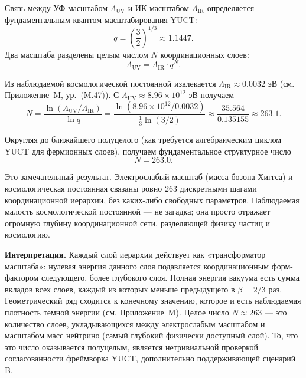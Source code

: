 \documentclass[11pt,a4paper]{article}
\newcommand{\LUV}{\Lambda_{\mathrm{UV}}}
\theoremstyle{remark}
\begin{document}
	Связь между УФ-масштабом \(\LUV\) и ИК-масштабом \(\Lambda_{\mathrm{IR}}\) определяется фундаментальным квантом масштабирования YUCT:
	\begin{equation}
		q = \left(\frac{3}{2}\right)^{1/3} \approx 1.1447.
	\end{equation}
	Два масштаба разделены целым числом \(N\) координационных слоев:
	\begin{equation}
		\LUV = \Lambda_{\mathrm{IR}} \cdot q^{N}.
		\label{eq:bridge}
	\end{equation}
	
	Из наблюдаемой космологической постоянной извлекается \(\Lambda_{\mathrm{IR}} \approx 0.0032\) эВ (см. Приложение~M, ур.~(M.47)). С \(\LUV \approx 8.96 \times 10^{12}\) эВ получаем
	\begin{equation}
		N = \frac{\ln(\LUV / \Lambda_{\mathrm{IR}})}{\ln q}
		= \frac{\ln(8.96 \times 10^{12} / 0.0032)}{\frac{1}{3}\ln(3/2)}
		\approx \frac{35.564}{0.135155} \approx 263.1.
		\label{eq:N_layers}
	\end{equation}
	
	Округляя до ближайшего полуцелого (как требуется алгебраическим циклом YUCT для фермионных слоев), получаем фундаментальное структурное число
	\begin{equation}
		\boxed{N = 263.0}.
	\end{equation}
	
	Это замечательный результат. Электрослабый масштаб (масса бозона Хиггса) и космологическая постоянная связаны ровно \(263\) дискретными шагами координационной иерархии, без каких-либо свободных параметров. Наблюдаемая малость космологической постоянной — не загадка; она просто отражает огромную глубину координационной сети, разделяющей физику частиц и космологию.
	
	\textbf{Интерпретация.} Каждый слой иерархии действует как «трансформатор масштаба»: нулевая энергия данного слоя подавляется координационным форм-фактором следующего, более глубокого слоя. Полная энергия вакуума есть сумма вкладов всех слоев, каждый из которых меньше предыдущего в \(\beta = 2/3\) раз. Геометрический ряд сходится к конечному значению, которое и есть наблюдаемая плотность темной энергии (см. Приложение~M). Целое число \(N \approx 263\) — это количество слоев, укладывающихся между электрослабым масштабом и масштабом масс нейтрино (самый глубокий физически доступный слой). То, что это число оказывается полуцелым, является нетривиальной проверкой согласованности фреймворка YUCT, дополнительно поддерживающей сценарий B.
	
\end{document}
